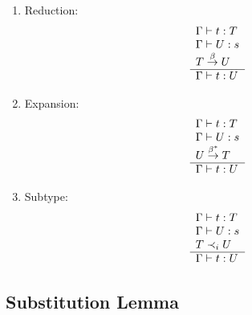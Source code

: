 \begin{definition}
\begin{enumerate}
\begin{enumerate}
            \item Reduction:
                $$
                \begin{array}{l} 
                    \Gamma \vdash t: T
                    \\
                    \Gamma \vdash U: s
                    \\
                    T \stackrel{\beta}{\to} U
                 \\ \hline 
                    \Gamma \vdash t: U
                \end{array}
                $$

            \item Expansion:
                $$
                \begin{array}{l} 
                    \Gamma \vdash t: T
                    \\
                    \Gamma \vdash U: s
                    \\
                    U \stackrel{\beta^*}{\to} T
                 \\ \hline 
                    \Gamma \vdash t: U
                \end{array}
                $$

            \item Subtype:
                $$
                \begin{array}{l} 
                    \Gamma \vdash t: T
                    \\
                    \Gamma \vdash U: s
                    \\
                    T \prec_i U
                 \\ \hline 
                    \Gamma \vdash t: U
                \end{array}
                $$
        \end{enumerate}
    \end{enumerate}
\end{definition}



\subsection{Substitution Lemma}



